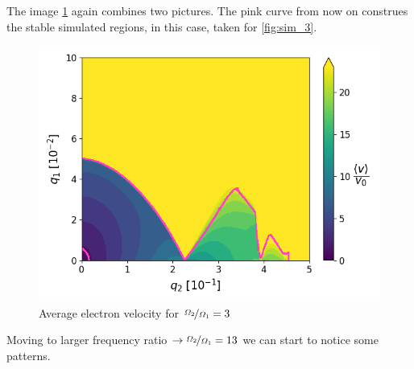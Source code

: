 The image \ref{fig:velocityedge-eta=3} again combines two pictures. The pink curve from now on construes the stable simulated regions, in this case, taken for \ref{fig:sim_3}. 
\begin{figure}[H]
	\centering
	\includegraphics[width=\linewidth]{img/0_ions_1_electrons_q1_0.0-0.1_q2_0.0-0.5_488x488_3_1000.png}
	\caption{Average electron velocity for $\nicefrac{\Omega_2}{\Omega_1} = 3$}
	\label{fig:velocityedge-eta=3}
\end{figure}

Moving to larger frequency ratio $\rightarrow \nicefrac{\Omega_2}{\Omega_1} = 13$ we can start to notice some patterns.

